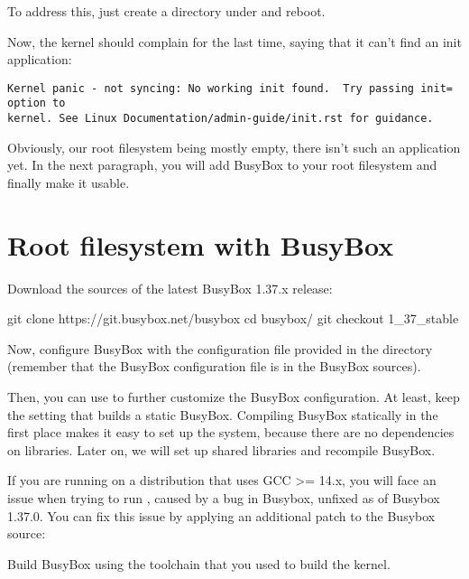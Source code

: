 To address this, just create a  directory under 
and reboot.

Now, the kernel should complain for the last time, saying that it can't
find an init application:

\begin{verbatim}
Kernel panic - not syncing: No working init found.  Try passing init= option to
kernel. See Linux Documentation/admin-guide/init.rst for guidance.
\end{verbatim}

Obviously, our root filesystem being mostly empty, there isn't such an
application yet. In the next paragraph, you will add BusyBox to your root
filesystem and finally make it usable.

\section{Root filesystem with BusyBox}

Download the sources of the latest BusyBox 1.37.x release:

\begin{bashinput}
git clone https://git.busybox.net/busybox
cd busybox/
git checkout 1_37_stable
\end{bashinput}

Now, configure BusyBox with the configuration file provided in the
 directory (remember that the BusyBox configuration file
is  in the BusyBox sources).

Then, you can use  to further customize
the BusyBox configuration. At least, keep the setting that
builds a static BusyBox. Compiling BusyBox statically in the first
place makes it easy to set up the system, because there are no dependencies
on libraries. Later on, we will set up shared libraries and recompile BusyBox.

If you are running on a distribution that uses GCC >= 14.x, you will
face an issue when trying to run , caused by a
bug in Busybox, unfixed as of Busybox 1.37.0. You can fix this issue
by applying an additional patch to the Busybox source:


Build BusyBox using the toolchain that you used to build the kernel.


